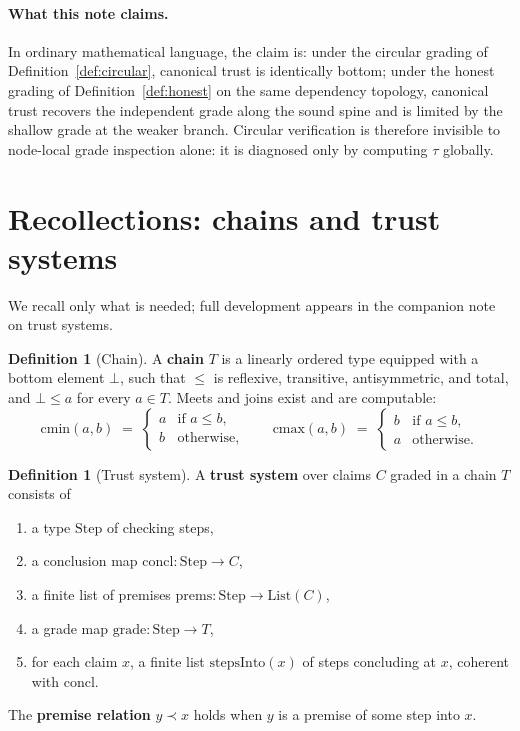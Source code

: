 \documentclass[11pt,a4paper]{article}
\theoremstyle{plain}
\theoremstyle{definition}
\newtheorem{definition}[theorem]{Definition}
\newcommand{\cmin}{\mathrm{cmin}}
\newcommand{\cmax}{\mathrm{cmax}}
\newcommand{\tauu}{\tau}
\begin{document}
\paragraph{What this note claims.}
In ordinary mathematical language, the claim is: under the circular grading
of Definition~\ref{def:circular}, canonical trust is identically bottom; under
the honest grading of Definition~\ref{def:honest} on the same dependency
topology, canonical trust recovers the independent grade along the sound
spine and is limited by the shallow grade at the weaker branch. Circular
verification is therefore invisible to node-local grade inspection alone: it
is diagnosed only by computing $\tauu$ globally.

\section{Recollections: chains and trust systems}

We recall only what is needed; full development appears in the companion
note on trust systems.

\begin{definition}[Chain]\label{def:chain}
A \textbf{chain} $T$ is a linearly ordered type equipped with a bottom
element $\bot$, such that $\le$ is reflexive, transitive, antisymmetric, and
total, and $\bot \le a$ for every $a \in T$. Meets and joins exist and are
computable:
\begin{equation}
  \cmin(a,b) \;=\;
  \begin{cases}
    a & \text{if } a \le b, \\
    b & \text{otherwise,}
  \end{cases}
  \qquad
  \cmax(a,b) \;=\;
  \begin{cases}
    b & \text{if } a \le b, \\
    a & \text{otherwise.}
  \end{cases}
\end{equation}
\end{definition}

\begin{definition}[Trust system]\label{def:system}
A \textbf{trust system} over claims $C$ graded in a chain $T$ consists of
\begin{enumerate}
  \item a type $\mathrm{Step}$ of checking steps,
  \item a conclusion map $\mathrm{concl} : \mathrm{Step} \to C$,
  \item a finite list of premises $\mathrm{prems} : \mathrm{Step} \to
        \mathrm{List}(C)$,
  \item a grade map $\mathrm{grade} : \mathrm{Step} \to T$,
  \item for each claim $x$, a finite list $\mathrm{stepsInto}(x)$ of steps
        concluding at $x$, coherent with $\mathrm{concl}$.
\end{enumerate}
The \textbf{premise relation} $y \prec x$ holds when $y$ is a premise of
some step into $x$.
\end{definition}
\end{document}
